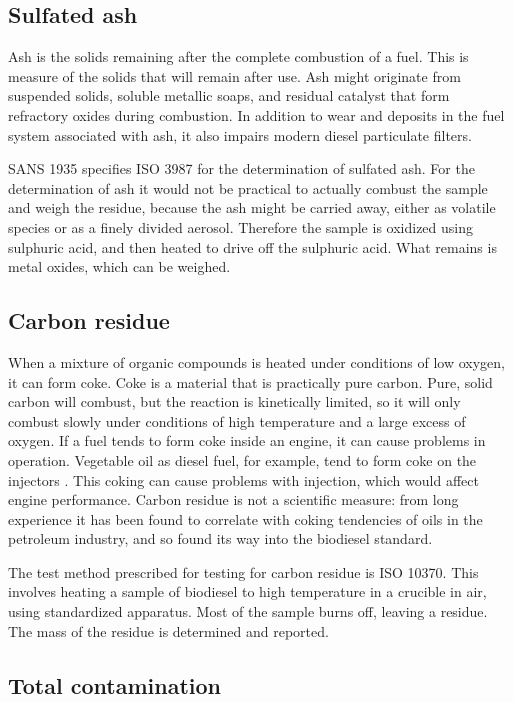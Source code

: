 \subsection{Sulfated ash}

Ash is the solids remaining after the complete combustion of a fuel. This is
measure of the solids that will remain after use. Ash might originate from
suspended solids, soluble metallic soaps, and residual catalyst that form
refractory oxides during combustion. In addition to wear and deposits in the
fuel system associated with ash, it also impairs modern diesel particulate
filters.

SANS 1935 specifies ISO 3987 for the determination of sulfated ash. For the
determination of ash it would not be practical to actually combust the sample
and weigh the residue, because the ash might be carried away, either as volatile
species or as a finely divided aerosol. Therefore the sample is oxidized using
sulphuric acid, and then heated to drive off the sulphuric acid. What remains is
metal oxides, which can be weighed.

\subsection{Carbon residue}

When a mixture of organic compounds is heated under conditions of low oxygen, it
can form coke. Coke is a material that is practically pure carbon. Pure, solid
carbon will combust, but the reaction is kinetically limited, so it will only
combust slowly under conditions of high temperature and a large excess of
oxygen. If a fuel tends to form coke inside an engine, it can cause problems in
operation. Vegetable oil as diesel fuel, for example, tend to form coke on the
injectors \autocite{vanderWalt1982}. This coking can cause problems with injection,
which would affect engine performance. Carbon residue is not a scientific
measure: from long experience it has been found to correlate with coking
tendencies of oils in the petroleum industry, and so found its way into the
biodiesel standard.

The test method prescribed for testing for carbon residue is ISO 10370. This
involves heating a sample of biodiesel to high temperature in a crucible in air,
using standardized apparatus. Most of the sample burns off, leaving a residue.
The mass of the residue is determined and reported.

\subsection{Total contamination}

